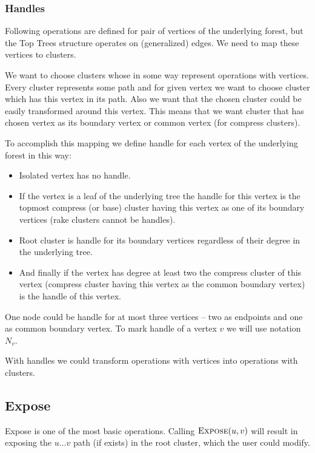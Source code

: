 \subsubsection{Handles}

Following operations are defined for pair of vertices of the underlying forest,
but the Top Trees structure operates on (generalized) edges. We need to map
these vertices to clusters.

We want to choose clusters whose in some way represent operations with
vertices. Every cluster represents some path and for given vertex we want to
choose cluster which has this vertex in its path. Also we want that the chosen
cluster could be easily transformed around this vertex. This means that we want
cluster that has chosen vertex as its boundary vertex or common vertex
(for compress clusters).

To accomplish this mapping we define {\I handle} for each vertex of the
underlying forest in this way:

\begin{itemize}
\item Isolated vertex has no handle.
\item If the vertex is a leaf of the underlying tree the
handle for this vertex is the topmost compress (or base) cluster having this
vertex as one of its boundary vertices (rake clusters cannot be handles).
\item Root cluster is handle for its boundary vertices regardless of their
degree in the underlying tree.
\item And finally if the vertex has degree at least two the compress cluster of
this vertex (compress cluster having this vertex as the common boundary vertex)
is the handle of this vertex.
\end{itemize}

One node could be handle for at most three vertices -- two as endpoints and one
as common boundary vertex. To mark handle of a vertex $v$ we will use notation
$N_v$.

With handles we could transform operations with vertices into operations with
clusters.

\subsection{\sc Expose}

Expose is one of the most basic operations. Calling $\hbox{\sc Expose}(u,v)$ will result in
exposing the $u\dots v$ path (if exists) in the root cluster, which the user
could modify.

